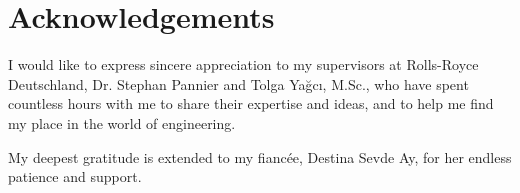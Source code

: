 \chapter*{Acknowledgements}
I would like to express sincere appreciation to my supervisors at Rolls-Royce Deutschland, Dr. Stephan Pannier and Tolga Ya\u{g}c\i{}, M.Sc., who have spent countless hours with me to share their expertise and ideas, and to help me find my place in the world of engineering.

My deepest gratitude is extended to my fianc\'ee, Destina Sevde Ay, for her endless patience and support.